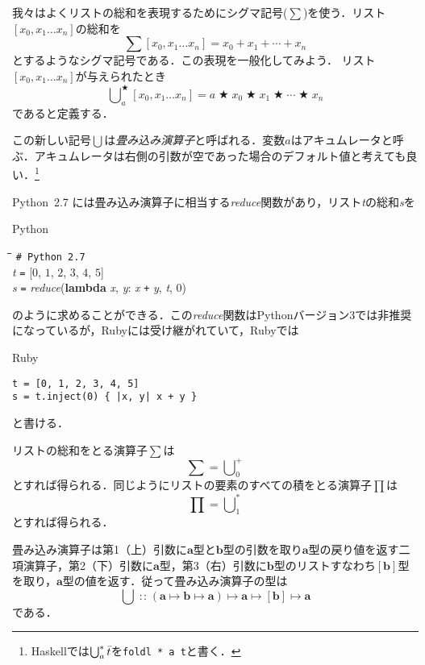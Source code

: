 \documentclass[twocolumn]{jsbook}
\newcommand{\programminglanguage}[1]{\textsf{#1}}
\newcommand{\haskell}{\programminglanguage{Haskell}}
\newcommand{\python}{\programminglanguage{Python}}
\newcommand{\code}[1]{\texttt{#1}}
\newcommand{\keyword}[1]{{\emph{#1}}}
\newenvironment{pythoncode}{\begin{itembox}[r]{\python}}{\end{itembox}}
\newenvironment{pythontab}{\begin{tabbing}\hspace*{1em}\=\hspace*{1em}\=\hspace*{1em}\=\hspace*{1em}\=\kill}{\end{tabbing}}
\newenvironment{rubycode}{\begin{itembox}[r]{Ruby}}{\end{itembox}}
\newcommand{\pthnId}[1]{\textit{#1}}
\newcommand{\pthnKeyword}[1]{\textbf{#1}}
\newcommand{\pthnOp}[1]{\texttt{#1}}
\newcommand{\hsklType}[1]{\textbf{#1}}
\newcommand{\hsklListType}[1]{[#1]}
\newcommand{\hsklList}[1]{\Bar{#1}}
\DeclareMathOperator{\mathAnyBinaryOperator}{\bigstar}
\DeclareMathOperator*{\mathFold}{\bigcup}
\DeclareMathOperator{\mathIn}{:\!:}
\DeclareMathOperator{\mathMapsTo}{\mapsto}
\newcommand{\mathMorphII}[3]{#1\mathMapsTo#2\mathMapsTo#3}
\newcommand{\mathMorphIII}[4]{#1\mathMapsTo#2\mathMapsTo#3\mathMapsTo#4}
\begin{document}
我々はよくリストの総和を表現するためにシグマ記号($\sum$)を使う．リスト$[x_0,x_1\dots x_n]$の総和を
\begin{equation}
\sum[x_0,x_1\dots x_n]=x_0+x_1+\dotsb+x_n
\end{equation}
とするようなシグマ記号である．この表現を一般化してみよう．
リスト$[x_0,x_1\dots x_n]$が与えられたとき
\begin{equation}
\mathFold^{\mathAnyBinaryOperator}_{a}[x_0,x_1\dots x_n]=a\mathAnyBinaryOperator x_0\mathAnyBinaryOperator x_1\mathAnyBinaryOperator\dotsb\mathAnyBinaryOperator x_n
\end{equation}
であると定義する．

この新しい記号$\mathFold$は\keyword{畳み込み演算子}と呼ばれる．変数$a$はアキュムレータと呼ぶ．アキュムレータは右側の引数が空であった場合のデフォルト値と考えても良い．\footnote{\haskell では$\mathFold^{*}_{a}\hsklList{t}$を\code{foldl * a t}と書く．}

\python\ 2.7 には畳み込み演算子に相当する\pthnId{reduce}関数があり，リスト\pthnId{t}の総和\pthnId{s}を
\begin{pythoncode}
\begin{pythontab}
\texttt{\# \python\  2.7}\\
\pthnId{t} \pthnOp{=} [$0$, $1$, $2$, $3$, $4$, $5$]\\
\pthnId{s} \pthnOp{=} \pthnId{reduce}(\pthnKeyword{lambda} \pthnId{x}, \pthnId{y}: \pthnId{x} \pthnOp{+} \pthnId{y}, \pthnId{t}, $0$)
\end{pythontab}
\end{pythoncode}
のように求めることができる．この\pthnId{reduce}関数は\python バージョン3では非推奨になっているが，Rubyには受け継がれていて，Rubyでは
\begin{rubycode}
\begin{verbatim}
t = [0, 1, 2, 3, 4, 5]
s = t.inject(0) { |x, y| x + y }
\end{verbatim}
\end{rubycode}
と書ける．

リストの総和をとる演算子$\sum$は
\begin{equation}
\sum=\mathFold^+_0
\end{equation}
とすれば得られる．同じようにリストの要素のすべての積をとる演算子$\prod$は
\begin{equation}
\prod=\mathFold^*_1
\end{equation}
とすれば得られる．

畳み込み演算子は第1（上）引数に$\hsklType{a}$型と$\hsklType{b}$型の引数を取り$\hsklType{a}$型の戻り値を返す二項演算子，第2（下）引数に$\hsklType{a}$型，第3（右）引数に$\hsklType{b}$型のリストすなわち$\hsklListType{\hsklType{b}}$型を取り，$\hsklType{a}$型の値を返す．従って畳み込み演算子の型は
\begin{equation}
\mathFold\mathIn\mathMorphIII{(\mathMorphII{\hsklType{a}}{\hsklType{b}}{\hsklType{a}})}{\hsklType{a}}{\hsklListType{\hsklType{b}}}{\hsklType{a}}
\end{equation}
である．
\end{document}
